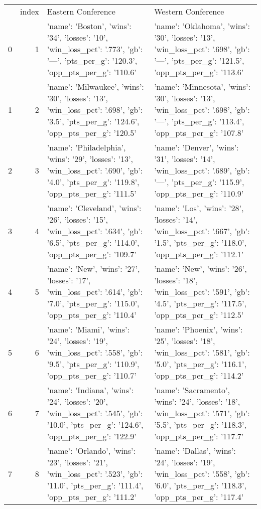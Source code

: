 \begin{tabular}{lrll}
 & index & Eastern Conference & Western Conference \\
0 & 1 & {'name': 'Boston', 'wins': '34', 'losses': '10', 'win_loss_pct': '.773', 'gb': '—', 'pts_per_g': '120.3', 'opp_pts_per_g': '110.6'} & {'name': 'Oklahoma', 'wins': '30', 'losses': '13', 'win_loss_pct': '.698', 'gb': '—', 'pts_per_g': '121.5', 'opp_pts_per_g': '113.6'} \\
1 & 2 & {'name': 'Milwaukee', 'wins': '30', 'losses': '13', 'win_loss_pct': '.698', 'gb': '3.5', 'pts_per_g': '124.6', 'opp_pts_per_g': '120.5'} & {'name': 'Minnesota', 'wins': '30', 'losses': '13', 'win_loss_pct': '.698', 'gb': '—', 'pts_per_g': '113.4', 'opp_pts_per_g': '107.8'} \\
2 & 3 & {'name': 'Philadelphia', 'wins': '29', 'losses': '13', 'win_loss_pct': '.690', 'gb': '4.0', 'pts_per_g': '119.8', 'opp_pts_per_g': '111.5'} & {'name': 'Denver', 'wins': '31', 'losses': '14', 'win_loss_pct': '.689', 'gb': '—', 'pts_per_g': '115.9', 'opp_pts_per_g': '110.9'} \\
3 & 4 & {'name': 'Cleveland', 'wins': '26', 'losses': '15', 'win_loss_pct': '.634', 'gb': '6.5', 'pts_per_g': '114.0', 'opp_pts_per_g': '109.7'} & {'name': 'Los', 'wins': '28', 'losses': '14', 'win_loss_pct': '.667', 'gb': '1.5', 'pts_per_g': '118.0', 'opp_pts_per_g': '112.1'} \\
4 & 5 & {'name': 'New', 'wins': '27', 'losses': '17', 'win_loss_pct': '.614', 'gb': '7.0', 'pts_per_g': '115.0', 'opp_pts_per_g': '110.4'} & {'name': 'New', 'wins': '26', 'losses': '18', 'win_loss_pct': '.591', 'gb': '4.5', 'pts_per_g': '117.5', 'opp_pts_per_g': '112.5'} \\
5 & 6 & {'name': 'Miami', 'wins': '24', 'losses': '19', 'win_loss_pct': '.558', 'gb': '9.5', 'pts_per_g': '110.9', 'opp_pts_per_g': '110.7'} & {'name': 'Phoenix', 'wins': '25', 'losses': '18', 'win_loss_pct': '.581', 'gb': '5.0', 'pts_per_g': '116.1', 'opp_pts_per_g': '114.2'} \\
6 & 7 & {'name': 'Indiana', 'wins': '24', 'losses': '20', 'win_loss_pct': '.545', 'gb': '10.0', 'pts_per_g': '124.6', 'opp_pts_per_g': '122.9'} & {'name': 'Sacramento', 'wins': '24', 'losses': '18', 'win_loss_pct': '.571', 'gb': '5.5', 'pts_per_g': '118.3', 'opp_pts_per_g': '117.7'} \\
7 & 8 & {'name': 'Orlando', 'wins': '23', 'losses': '21', 'win_loss_pct': '.523', 'gb': '11.0', 'pts_per_g': '111.4', 'opp_pts_per_g': '111.2'} & {'name': 'Dallas', 'wins': '24', 'losses': '19', 'win_loss_pct': '.558', 'gb': '6.0', 'pts_per_g': '118.3', 'opp_pts_per_g': '117.4'} \\

\end{tabular}
